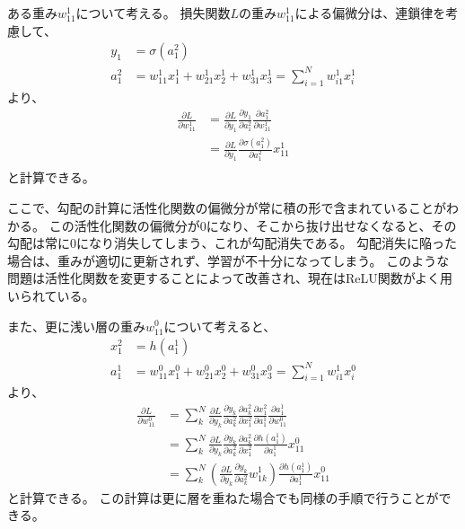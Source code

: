 ある重み$w^1_{11}$について考える。
損失関数$L$の重み$w^1_{11}$による偏微分は、連鎖律を考慮して、
\begin{equation}
 \begin{split}
  y_1 &= \sigma(a^2_1)\\
  a^2_1 &= w^1_{11} x^1_1 + w^1_{21} x^1_2 + w^1_{31} x^1_3 = \sum^N_{i=1} w^1_{i1} x^1_i
 \end{split}
\end{equation}
より、
\begin{equation}
 \begin{split}
  \frac{\partial L}{\partial w^1_{11}} 
  &= \frac{\partial L}{\partial y_1}\frac{\partial y_1}{\partial a^2_1}\frac{\partial a^2_1}{\partial w^1_{11}}\\
  &= \frac{\partial L}{\partial y_1}\frac{\partial \sigma(a^2_1)}{\partial a^2_1}x^1_{11}\\
 \end{split}
\end{equation}
と計算できる。

ここで、勾配の計算に活性化関数の偏微分が常に積の形で含まれていることがわかる。
この活性化関数の偏微分が$0$になり、そこから抜け出せなくなると、その勾配は常に$0$になり消失してしまう、これが勾配消失である。
勾配消失に陥った場合は、重みが適切に更新されず、学習が不十分になってしまう。
このような問題は活性化関数を変更することによって改善され、現在はReLU関数がよく用いられている。

また、更に浅い層の重み$w^0_{11}$について考えると、
\begin{equation}
 \begin{split}
  x^2_1 &= h(a^1_1)\\
  a^1_1 &= w^0_{11} x^0_1 + w^0_{21} x^0_2 + w^0_{31} x^0_3 = \sum^N_{i=1} w^1_{i1} x^0_i
 \end{split}
\end{equation}
より、
\begin{equation}
 \begin{split}
  \frac{\partial L}{\partial w^0_{11}} 
  &= \sum^N_{k} \frac{\partial L}{\partial y_k}\frac{\partial y_k}{\partial a^2_k}\frac{\partial a^2_k}{\partial x^2_1}\frac{\partial x^2_1}{\partial a^1_1}\frac{\partial a^1_1}{\partial w^0_{11}}\\
  &= \sum^N_{k} \frac{\partial L}{\partial y_k}\frac{\partial y_k}{\partial a^2_k}\frac{\partial a^2_k}{\partial x^2_1}\frac{\partial h(a^1_1)}{\partial a^1_1}x^0_{11}\\
  &= \sum^N_{k} \left(\frac{\partial L}{\partial y_k}\frac{\partial y_k}{\partial a^2_k}w^1_{1k}\right)\frac{\partial h(a^1_1)}{\partial a^1_1}x^0_{11}
 \end{split}
\end{equation}
と計算できる。
この計算は更に層を重ねた場合でも同様の手順で行うことができる。

